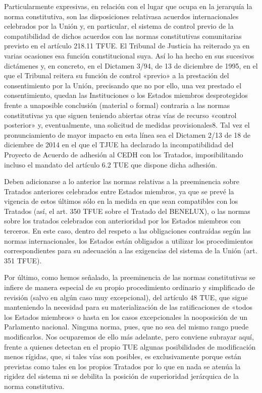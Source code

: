 \documentclass[10pt,a4paper]{article}
\begin{document}
Particularmente expresivas, en relación con el lugar que ocupa en la jerarquía la norma constitutiva, son las disposiciones relativasa acuerdos internacionales celebrados por la Unión y, en particular, el sistema de control previo de la compatibilidad de dichos acuerdos con las normas constitutivas comunitarias previsto en el artículo 218.11 TFUE. El Tribunal de Justicia ha reiterado ya en varias ocasiones esa función constitucional suya. Así lo ha hecho en sus sucesivos dictámenes y, en concreto, en el Dictamen 3/94, de 13 de diciembre de 1995, en el que el Tribunal reitera su función de control «previo» a la prestación del consentimiento por la Unión, precisando que no por ello, una vez prestado el consentimiento, quedan las Instituciones o los Estados miembros desprotegidos frente a unaposible conclusión (material o formal) contraria a las normas constitutivas ya que siguen teniendo abiertas otras vías de recurso «control posterior» y, eventualmente, una solicitud de medidas provisionales8. Tal vez el pronunciamiento de mayor impacto en esta línea sea el Dictamen 2/13 de 18 de diciembre de 2014 en el que el TJUE ha declarado la incompatibilidad del Proyecto de Acuerdo de adhesión al CEDH con los Tratados, imposibilitando incluso el mandato del artículo 6.2 TUE que dispone dicha adhesión. 

Deben adicionarse a lo anterior las normas relativas a la preeminencia sobre Tratados anteriores celebrados entre Estados miembros, ya que se prevé la vigencia de estos últimos sólo en la medida en que sean compatibles con los Tratados (así, el art. 350 TFUE sobre el Tratado del BENELUX), o las normas sobre los tratados celebrados con anterioridad por los Estados miembros con terceros. En este caso, dentro del respeto a las obligaciones contraídas según las normas internacionales, los Estados están obligados a utilizar los procedimientos correspondientes para su adecuación a las exigencias del sistema de la Unión (art. 351 TFUE).

Por último, como hemos señalado, la preeminencia de las normas constitutivas se infiere de manera especial de su propio procedimiento ordinario y simplificado de revisión (salvo en algún caso muy excepcional), del artículo 48 TUE, que sigue manteniendo la necesidad para su materialización de las ratificaciones de «todos los Estados miembros» o hasta en los casos excepcionales la nooposición de un Parlamento nacional. Ninguna norma, pues, que no sea del mismo rango puede modificarlos. Nos ocuparemos de ello más adelante, pero conviene subrayar aquí, frente a quienes detectan en el propio TUE algunas posibilidades de modificación menos rígidas, que, si tales vías son posibles, es exclusivamente porque están previstas como tales en los propios Tratados por lo que en nada se atenúa la rigidez del sistema ni se debilita la posición de superioridad jerárquica de la norma constitutiva.
\end{document}
